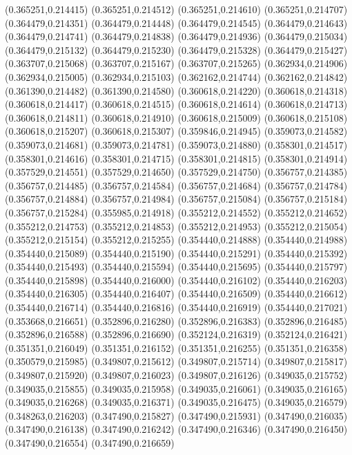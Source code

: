 (0.365251,0.214415)
(0.365251,0.214512)
(0.365251,0.214610)
(0.365251,0.214707)
(0.364479,0.214351)
(0.364479,0.214448)
(0.364479,0.214545)
(0.364479,0.214643)
(0.364479,0.214741)
(0.364479,0.214838)
(0.364479,0.214936)
(0.364479,0.215034)
(0.364479,0.215132)
(0.364479,0.215230)
(0.364479,0.215328)
(0.364479,0.215427)
(0.363707,0.215068)
(0.363707,0.215167)
(0.363707,0.215265)
(0.362934,0.214906)
(0.362934,0.215005)
(0.362934,0.215103)
(0.362162,0.214744)
(0.362162,0.214842)
(0.361390,0.214482)
(0.361390,0.214580)
(0.360618,0.214220)
(0.360618,0.214318)
(0.360618,0.214417)
(0.360618,0.214515)
(0.360618,0.214614)
(0.360618,0.214713)
(0.360618,0.214811)
(0.360618,0.214910)
(0.360618,0.215009)
(0.360618,0.215108)
(0.360618,0.215207)
(0.360618,0.215307)
(0.359846,0.214945)
(0.359073,0.214582)
(0.359073,0.214681)
(0.359073,0.214781)
(0.359073,0.214880)
(0.358301,0.214517)
(0.358301,0.214616)
(0.358301,0.214715)
(0.358301,0.214815)
(0.358301,0.214914)
(0.357529,0.214551)
(0.357529,0.214650)
(0.357529,0.214750)
(0.356757,0.214385)
(0.356757,0.214485)
(0.356757,0.214584)
(0.356757,0.214684)
(0.356757,0.214784)
(0.356757,0.214884)
(0.356757,0.214984)
(0.356757,0.215084)
(0.356757,0.215184)
(0.356757,0.215284)
(0.355985,0.214918)
(0.355212,0.214552)
(0.355212,0.214652)
(0.355212,0.214753)
(0.355212,0.214853)
(0.355212,0.214953)
(0.355212,0.215054)
(0.355212,0.215154)
(0.355212,0.215255)
(0.354440,0.214888)
(0.354440,0.214988)
(0.354440,0.215089)
(0.354440,0.215190)
(0.354440,0.215291)
(0.354440,0.215392)
(0.354440,0.215493)
(0.354440,0.215594)
(0.354440,0.215695)
(0.354440,0.215797)
(0.354440,0.215898)
(0.354440,0.216000)
(0.354440,0.216102)
(0.354440,0.216203)
(0.354440,0.216305)
(0.354440,0.216407)
(0.354440,0.216509)
(0.354440,0.216612)
(0.354440,0.216714)
(0.354440,0.216816)
(0.354440,0.216919)
(0.354440,0.217021)
(0.353668,0.216651)
(0.352896,0.216280)
(0.352896,0.216383)
(0.352896,0.216485)
(0.352896,0.216588)
(0.352896,0.216690)
(0.352124,0.216319)
(0.352124,0.216421)
(0.351351,0.216049)
(0.351351,0.216152)
(0.351351,0.216255)
(0.351351,0.216358)
(0.350579,0.215985)
(0.349807,0.215612)
(0.349807,0.215714)
(0.349807,0.215817)
(0.349807,0.215920)
(0.349807,0.216023)
(0.349807,0.216126)
(0.349035,0.215752)
(0.349035,0.215855)
(0.349035,0.215958)
(0.349035,0.216061)
(0.349035,0.216165)
(0.349035,0.216268)
(0.349035,0.216371)
(0.349035,0.216475)
(0.349035,0.216579)
(0.348263,0.216203)
(0.347490,0.215827)
(0.347490,0.215931)
(0.347490,0.216035)
(0.347490,0.216138)
(0.347490,0.216242)
(0.347490,0.216346)
(0.347490,0.216450)
(0.347490,0.216554)
(0.347490,0.216659)
